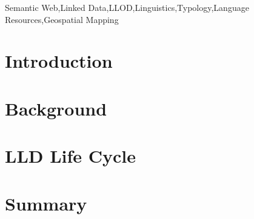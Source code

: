 \documentclass{iosart2c}
\begin{document}
\begin{frontmatter}
\begin{abstract}
\end{abstract}

\begin{keyword}
Semantic Web\sep Linked Data\sep LLOD\sep Linguistics\sep Typology\sep Language Resources\sep Geospatial Mapping
\end{keyword}

\end{frontmatter}


\section{Introduction}\label{sec:intro}


\section{Background}


\section{LLD Life Cycle}


% 

\section{Summary}




\end{document}
